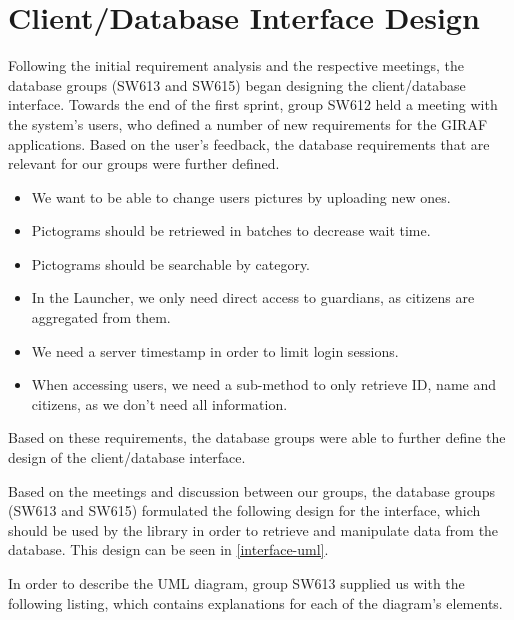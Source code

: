 \section{Client/Database Interface Design}
Following the initial requirement analysis and the respective meetings, the
database groups (SW613 and SW615) began designing the client/database interface.
Towards the end of the first sprint, group SW612 held a meeting with the
system's users, who defined a number of new requirements for the GIRAF
applications. Based on the user's feedback, the database requirements that are
relevant for our groups were further defined.

\begin{itemize}
  \item We want to be able to change users pictures by uploading new ones.
  \item Pictograms should be retriewed in batches to decrease wait time.
  \item Pictograms should be searchable by category.
  \item In the Launcher, we only need direct access to guardians, as citizens
  are aggregated from them.
  \item We need a server timestamp in order to limit login sessions.
  \item When accessing users, we need a sub-method to only retrieve ID, name and
  citizens, as we don't need all information.
\end{itemize}

Based on these requirements, the database groups were able to further define
the design of the client/database interface.\nl

Based on the meetings and discussion between our groups, the database groups
(SW613 and SW615) formulated the following design for the interface, which
should be used by the  library in order to retrieve and
manipulate data from the database. This design can be seen in
\autoref{interface-uml}.


In order to describe the UML diagram, group SW613 supplied us with the
following listing, which contains explanations for each of the diagram's
elements.

